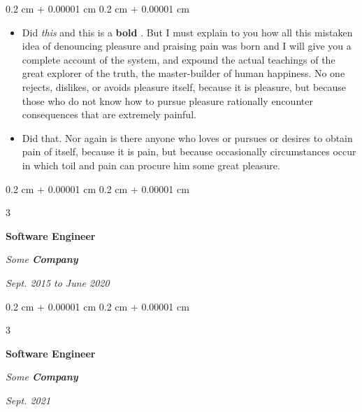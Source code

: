 \documentclass[10pt, letterpaper]{article}
\newenvironment{highlights}{
    \begin{itemize}[
        topsep=0.10 cm,
        parsep=0.10 cm,
        partopsep=0pt,
        itemsep=0pt,
        leftmargin=0.4 cm + 10pt + 0.6 cm
    ]
}{
    \end{itemize}
} %
\newenvironment{onecolentry}{
    \begin{adjustwidth}{
        0.2 cm + 0.00001 cm
    }{
        0.2 cm + 0.00001 cm
    }
}{
    \end{adjustwidth}
} %
\newenvironment{threecolentry}[3][]{
    \onecolentry
    \def\thirdColumn{#3}
    \setcolumnwidth{0.6 cm, \fill, 4.5 cm}
    \begin{paracol}{3}
    #2 \switchcolumn
}{
    \switchcolumn \raggedleft \thirdColumn
    \end{paracol}
    \endonecolentry
} %
\let\hrefWithoutArrow\href
\renewcommand{\href}[2]{\hrefWithoutArrow{#1}{\mbox{\ifthenelse{\equal{#2}{}}{ }{#2 }\raisebox{.15ex}{\footnotesize \faExternalLink*}}}}
\begin{document}
        \vspace{0.10 cm-3px}
        \begin{onecolentry}
            \begin{highlights}
                \item Did \textit{this} and this is a \textbf{bold} \href{https://example.com}{link}. But I must explain to you how all this mistaken idea of denouncing pleasure and praising pain was born and I will give you a complete account of the system, and expound the actual teachings of the great explorer of the truth, the master-builder of human happiness. No one rejects, dislikes, or avoids pleasure itself, because it is pleasure, but because those who do not know how to pursue pleasure rationally encounter consequences that are extremely painful.
                \item Did that. Nor again is there anyone who loves or pursues or desires to obtain pain of itself, because it is pain, but because occasionally circumstances occur in which toil and pain can procure him some great pleasure.
            \end{highlights}
        \end{onecolentry}


        \vspace{0.2 cm-3px}

        \begin{threecolentry}{
            \vspace*{\fill}
            \textbullet
            \vspace*{3px}
            \vspace*{\fill}
        }{
            
            
        \textit{Sept. 2015 to June 2020}}
            \textbf{Software Engineer}
            
            \textit{Some \textbf{Company}}
        \end{threecolentry}



        \vspace{0.2 cm-3px}

        \begin{threecolentry}{
            \vspace*{\fill}
            \textbullet
            \vspace*{3px}
            \vspace*{\fill}
        }{
            
            
        \textit{Sept. 2021}}
            \textbf{Software Engineer}
            
            \textit{Some \textbf{Company}}
        \end{threecolentry}
\end{document}
